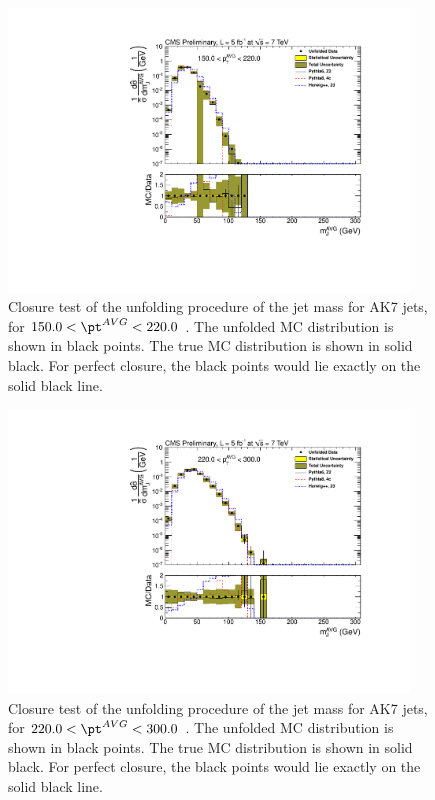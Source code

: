 \begin{figure}[htbp]
\centering
\includegraphics[width=0.95\textwidth]{figs/unfoldedMeasurementDijets_3_closuretest}
\caption{Closure test of the unfolding procedure of the jet mass for AK7 jets,
for $150.0 < \pt^{AVG} < 220.0$ \GeVc. The unfolded MC distribution is shown in black points.
The true MC distribution is shown in solid black. For perfect closure, the black points would
lie exactly on the solid black line.  
\label{figs:unfoldedMeasurementDijets_3_closuretest}}
\end{figure}



\begin{figure}[htbp]
\centering
\includegraphics[width=0.95\textwidth]{figs/unfoldedMeasurementDijets_4_closuretest}
\caption{Closure test of the unfolding procedure of the jet mass for AK7 jets,
for $220.0 < \pt^{AVG} < 300.0$ \GeVc. The unfolded MC distribution is shown in black points.
The true MC distribution is shown in solid black. For perfect closure, the black points would
lie exactly on the solid black line.  
\label{figs:unfoldedMeasurementDijets_4_closuretest}}
\end{figure}



